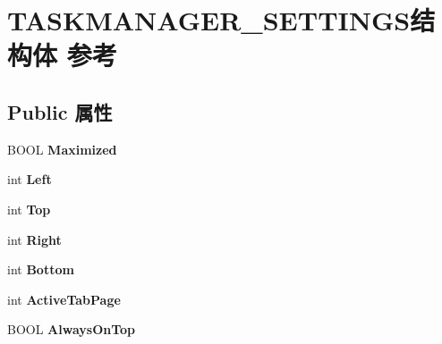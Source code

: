 \hypertarget{struct_t_a_s_k_m_a_n_a_g_e_r___s_e_t_t_i_n_g_s}{}\section{T\+A\+S\+K\+M\+A\+N\+A\+G\+E\+R\+\_\+\+S\+E\+T\+T\+I\+N\+G\+S结构体 参考}
\label{struct_t_a_s_k_m_a_n_a_g_e_r___s_e_t_t_i_n_g_s}
\subsection*{Public 属性}
\begin{DoxyCompactItemize}
\item 
\mbox{\label{struct_t_a_s_k_m_a_n_a_g_e_r___s_e_t_t_i_n_g_s_aec708dac96fb21e98309e17998bd973b}} 
B\+O\+OL {\bfseries Maximized}
\item 
\mbox{\label{struct_t_a_s_k_m_a_n_a_g_e_r___s_e_t_t_i_n_g_s_a6e4006c2b4d1c03d6dc4dffe53d7839b}} 
int {\bfseries Left}
\item 
\mbox{\label{struct_t_a_s_k_m_a_n_a_g_e_r___s_e_t_t_i_n_g_s_adfbc40507bd5cb41f8257c6ff0e0eae9}} 
int {\bfseries Top}
\item 
\mbox{\label{struct_t_a_s_k_m_a_n_a_g_e_r___s_e_t_t_i_n_g_s_aaefbac5a5f4475da07cb1f922050084d}} 
int {\bfseries Right}
\item 
\mbox{\label{struct_t_a_s_k_m_a_n_a_g_e_r___s_e_t_t_i_n_g_s_a2ac6fd83fdb84468d50fe329ddb043c1}} 
int {\bfseries Bottom}
\item 
\mbox{\label{struct_t_a_s_k_m_a_n_a_g_e_r___s_e_t_t_i_n_g_s_a4509da78603f5d4212d5d2688158a22d}} 
int {\bfseries Active\+Tab\+Page}
\item 
\mbox{\label{struct_t_a_s_k_m_a_n_a_g_e_r___s_e_t_t_i_n_g_s_a4fce94ed33601c87787137a98f1976db}} 
B\+O\+OL {\bfseries Always\+On\+Top}
\item 

\end{DoxyCompactItemize}
